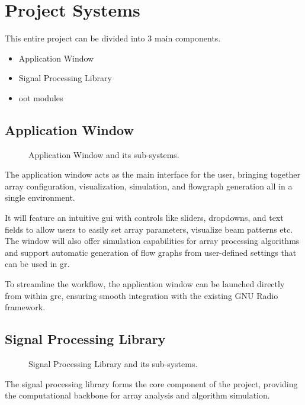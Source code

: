 \chapter{Project Systems} \label{ch: project-systems}

This entire project can be divided into 3 main components.

\begin{itemize}
	\item Application Window
	\item Signal Processing Library
	\item \ac{oot} modules
\end{itemize}

\section{Application Window}

\begin{figure}[h]
	\centering
	\caption{Application Window and its sub-systems.}
\end{figure}

The application window acts as the main interface for the user, bringing together array configuration, visualization, simulation, and flowgraph generation all in a single environment.

It will feature an intuitive \ac{gui} with controls like sliders, dropdowns, and text fields to allow users to easily set array parameters, visualize beam patterns etc. The window will also offer simulation capabilities for array processing algorithms and support automatic generation of flow graphs from user-defined settings that can be used in \acl{gr}.

To streamline the workflow, the application window can be launched directly from within \ac{grc}, ensuring smooth integration with the existing GNU Radio framework.

\section{Signal Processing Library}

\begin{figure}[h]
	\centering
	\caption{Signal Processing Library and its sub-systems.}
\end{figure}


The signal processing library forms the core component of the project, providing the computational backbone for array analysis and algorithm simulation.

